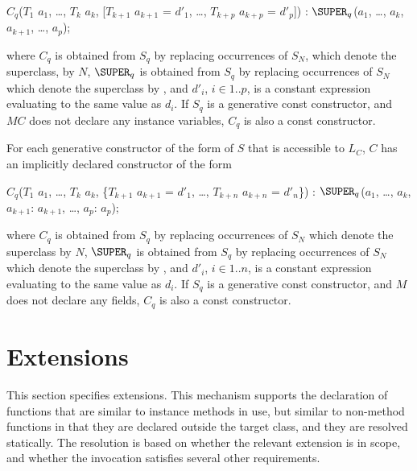 \documentclass[makeidx]{article}
\begin{document}
\begin{normativeDartCode}
$C_q$($T_{1}$ $a_{1}$, \ldots , $T_{k}$ $a_{k}$, [$T_{k+1}$ $a_{k+1}$ = $d'_{1}$, \ldots , $T_{k+p}$ $a_{k+p}$ = $d'_p$])
    : $\SUPER_q$($a_{1}$, \ldots , $a_{k}$, $a_{k+1}$, \ldots, $a_p$);
\end{normativeDartCode}

\noindent
where $C_q$ is obtained from $S_q$ by replacing occurrences of $S_N$,
which denote the superclass, by $N$,
$\SUPER_q$ is obtained from $S_q$ by replacing occurrences of $S_N$
which denote the superclass by \SUPER,
and $d'_i$, $i \in 1..p$, is a constant expression evaluating
to the same value as $d_i$.
If $S_q$ is a generative const constructor, and $MC$ does not declare any
instance variables, $C_q$ is also a const constructor.

\LMHash{}%
For each generative constructor of the form
of $S$ that is accessible to $L_C$, $C$ has
an implicitly declared constructor of the form

\begin{normativeDartCode}
$C_q$($T_{1}$ $a_{1}$, \ldots , $T_{k}$ $a_{k}$, \{$T_{k+1}$ $a_{k+1}$ = $d'_1$, \ldots , $T_{k+n}$ $a_{k+n}$ = $d'_n$\})
    : $\SUPER_q$($a_{1}$, \ldots , $a_{k}$, $a_{k+1}$: $a_{k+1}$, \ldots, $a_p$: $a_p$);
\end{normativeDartCode}

\noindent
where $C_q$ is obtained from $S_q$ by replacing occurrences of $S_N$
which denote the superclass by $N$,
$\SUPER_q$ is obtained from $S_q$ by replacing occurrences of $S_N$
which denote the superclass by \SUPER,
and $d'_i$, $i \in 1..n$, is a constant expression evaluating to
the same value as $d_i$.
If $S_q$ is a generative const constructor, and $M$ does not declare any
fields, $C_q$ is also a const constructor.


\section{Extensions}

\LMHash{}%
This section specifies extensions.
This mechanism supports the declaration of functions
that are similar to instance methods in use,
but similar to non-method functions in that
they are declared outside the target class,
and they are resolved statically.
The resolution is based on whether the relevant extension is in scope,
and whether the invocation satisfies several other requirements.
\end{document}
